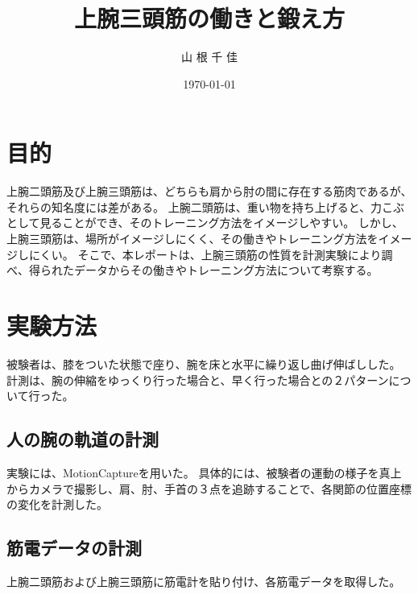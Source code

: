 \documentclass{jsarticle}
\title{上腕三頭筋の働きと鍛え方}
\date{\today}
\author{山 根 千 佳}
\begin{document}
%

\maketitle


\section{目的}
上腕二頭筋及び上腕三頭筋は、どちらも肩から肘の間に存在する筋肉であるが、それらの知名度には差がある。
上腕二頭筋は、重い物を持ち上げると、力こぶとして見ることができ、そのトレーニング方法をイメージしやすい。
しかし、上腕三頭筋は、場所がイメージしにくく、その働きやトレーニング方法をイメージしにくい。
そこで、本レポートは、上腕三頭筋の性質を計測実験により調べ、得られたデータからその働きやトレーニング方法について考察する。

\section{実験方法}
被験者は、膝をついた状態で座り、腕を床と水平に繰り返し曲げ伸ばしした。
計測は、腕の伸縮をゆっくり行った場合と、早く行った場合との２パターンについて行った。

\subsection{人の腕の軌道の計測}
実験には、MotionCaptureを用いた。
具体的には、被験者の運動の様子を真上からカメラで撮影し、肩、肘、手首の３点を追跡することで、各関節の位置座標の変化を計測した。

\subsection{筋電データの計測}
上腕二頭筋および上腕三頭筋に筋電計を貼り付け、各筋電データを取得した。
\end{document}
